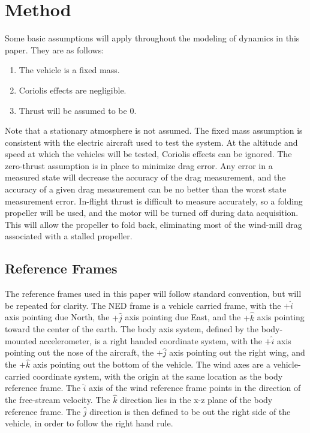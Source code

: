\chapter{Method}
\label{background-information}
Some basic assumptions will apply throughout the modeling of dynamics in this paper. They are as follows:
\begin{enumerate}
\item The vehicle is a fixed mass.
\item Coriolis effects are negligible.
\item Thrust will be assumed to be 0.
\end{enumerate}
Note that a stationary atmosphere is not assumed. The fixed mass assumption is consistent with the electric aircraft used to test the system. At the altitude and speed at which the vehicles will be tested, Coriolis effects can be ignored\cite{klein2006aircraft}. The zero-thrust assumption is in place to minimize drag error. Any error in a measured state will decrease the accuracy of the drag measurement, and the accuracy of a given drag measurement can be no better than the worst state measurement error. In-flight thrust is difficult to measure accurately, so a folding propeller will be used, and the motor will be turned off during data acquisition. This will allow the propeller to fold back, eliminating most of the wind-mill drag associated with a stalled propeller. 

\section{Reference Frames}
The reference frames used in this paper will follow standard convention\cite{klein2006aircraft}, but will be repeated for clarity. The NED frame is a vehicle carried frame, with the $+\hat{i}$ axis pointing due North, the $+\hat{j}$ axis pointing due East, and the $+\hat{k}$ axis pointing toward the center of the earth. The body axis system, defined by the body-mounted accelerometer, is a right handed coordinate system, with the $+\hat{i}$ axis pointing out the nose of the aircraft, the $+\hat{j}$ axis pointing out the right wing, and the $+\hat{k}$ axis pointing out the bottom of the vehicle. The wind axes are a vehicle-carried coordinate system, with the origin at the same location as the body reference frame. The $\hat{i}$ axis of the wind reference frame points in the direction of the free-stream velocity. The $\hat{k}$ direction lies in the x-z plane of the body reference frame. The $\hat{j}$ direction is then defined to be out the right side of the vehicle, in order to follow the right hand rule. 

